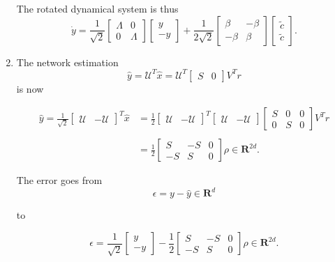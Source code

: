 \begin{enumerate}
The rotated dynamical system is thus
$$
\dot{y} = \frac{1}{\sqrt{2}} \begin{bmatrix}
\Lambda & 0
\\
0 & \Lambda
\end{bmatrix}
\begin{bmatrix}
y\\-y
\end{bmatrix}
+ 
\frac{1}{2\sqrt{2}}
\begin{bmatrix}
\beta & -\beta
\\
-\beta & \beta
\end{bmatrix}
\begin{bmatrix}
\tilde{c}
\\
\tilde{c}
\end{bmatrix}.
$$




\item The network estimation 
$$
\hat{y}  = \mathcal{U}^T \hat{x} = \mathcal{U}^T \begin{bmatrix}
S & 0
\end{bmatrix} 
V^T r
$$
is now

\begin{align*}
\hat{y} = \frac{1}{\sqrt{2}}\begin{bmatrix}
\mathcal{U} & -\mathcal{U}
\end{bmatrix}^T
\hat{x}
&=
\frac{1}{2}\begin{bmatrix}
\mathcal{U} & -\mathcal{U}
\end{bmatrix} ^T \begin{bmatrix}
\mathcal{U} & -\mathcal{U}
\end{bmatrix} \begin{bmatrix}
S & 0 & 0
\\
0 & S & 0
\end{bmatrix}
V^T r
\\
\\
&=
\frac{1}{2}\begin{bmatrix}
S & -S & 0
\\
-S & S & 0
\end{bmatrix}
\rho \in \mathbf{R}^{2d}.
\end{align*}

The error goes from 
$$
\epsilon = y - \hat{y} \in \mathbf{R}^d
$$

to

$$
\epsilon = \frac{1}{\sqrt{2}}\begin{bmatrix}
y \\ - y
\end{bmatrix}
-
\frac{1}{2}\begin{bmatrix}
S & -S & 0
\\
-S & S & 0
\end{bmatrix}
\rho \in \mathbf{R}^{2d}.
$$


\end{enumerate}
